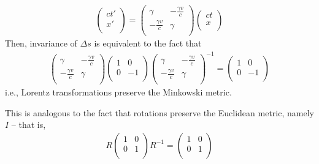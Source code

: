 \documentclass{../template/note}
\begin{document}
    \begin{align*}
        \begin{pmatrix}
         ct' \\
         x' \\
        \end{pmatrix} = \begin{pmatrix}
         \gamma & -\frac{\gamma v}{c} \\
         -\frac{\gamma v}{c} & \gamma \\
        \end{pmatrix}\begin{pmatrix}
         ct \\
         x \\
        \end{pmatrix}
    \end{align*}
    Then, invariance of \(\Delta s\) is equivalent to the fact that
    \begin{align*}
        \begin{pmatrix}
         \gamma & -\frac{\gamma v}{c} \\
         -\frac{\gamma v}{c} & \gamma \\
        \end{pmatrix}\begin{pmatrix}
         1 & 0 \\
         0 & -1 \\
        \end{pmatrix} \begin{pmatrix}
         \gamma & -\frac{\gamma v}{c} \\
         -\frac{\gamma v}{c} & \gamma \\
        \end{pmatrix}^{-1} = \begin{pmatrix}
         1 & 0 \\
         0 & -1 \\
        \end{pmatrix}
    \end{align*}
    i.e., Lorentz transformations preserve the Minkowski metric.

    \begin{remark*}
        This is analogous to the fact that rotations preserve the Euclidean metric, namely \(I\) -- that is,
        \begin{align*}
            R\begin{pmatrix}
             1 & 0 \\
             0 & 1 \\
            \end{pmatrix} R^{-1} = \begin{pmatrix}
             1 & 0 \\
             0 & 1 \\
            \end{pmatrix}
        \end{align*}
    \end{remark*}
    
\end{document}
